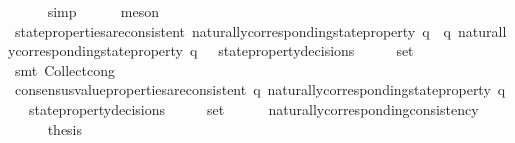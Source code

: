 \begin{isabellebody}
\ \ \ \ \isamarkupfalse%
\ {\isacharparenleft}simp{\isacharparenright}\isanewline
\ \ \ \ \isamarkupfalse%
\ meson\ \isanewline
\ \ \isamarkupfalse%
\ {\isachardoublequoteopen}state{\isacharunderscore}properties{\isacharunderscore}are{\isacharunderscore}consistent\ {\isacharbraceleft}naturally{\isacharunderscore}corresponding{\isacharunderscore}state{\isacharunderscore}property\ q\ {\isacharbar}\ q{\isachardot}\ naturally{\isacharunderscore}corresponding{\isacharunderscore}state{\isacharunderscore}property\ q\ {\isasymin}\ {\isasymUnion}\ {\isacharbraceleft}state{\isacharunderscore}property{\isacharunderscore}decisions\ {\isasymsigma}\ {\isacharbar}\ {\isasymsigma}{\isachardot}\ {\isasymsigma}\ {\isasymin}\ {\isasymsigma}{\isacharunderscore}set{\isacharbraceright}{\isacharbraceright}{\isachardoublequoteclose}\isanewline
\ \ \ \ \isamarkupfalse%
\ {\isacharparenleft}smt\ Collect{\isacharunderscore}cong{\isacharparenright}\isanewline
\ \ \isamarkupfalse%
\ {\isachardoublequoteopen}consensus{\isacharunderscore}value{\isacharunderscore}properties{\isacharunderscore}are{\isacharunderscore}consistent\ {\isacharbraceleft}q{\isachardot}\ naturally{\isacharunderscore}corresponding{\isacharunderscore}state{\isacharunderscore}property\ q\ {\isasymin}\ {\isasymUnion}\ {\isacharbraceleft}state{\isacharunderscore}property{\isacharunderscore}decisions\ {\isasymsigma}\ {\isacharbar}\ {\isasymsigma}{\isachardot}\ {\isasymsigma}\ {\isasymin}\ {\isasymsigma}{\isacharunderscore}set{\isacharbraceright}{\isacharbraceright}{\isachardoublequoteclose}\isanewline
\ \ \ \ \isamarkupfalse%
\ naturally{\isacharunderscore}corresponding{\isacharunderscore}consistency\isanewline
\ \ \isamarkupfalse%
\ {\isacharminus}\isanewline
\ \ \ \ \isamarkupfalse%
\ {\isacharquery}thesis\isanewline
\ \ \ \ \ \ \isamarkupfalse%

\end{isabellebody}
